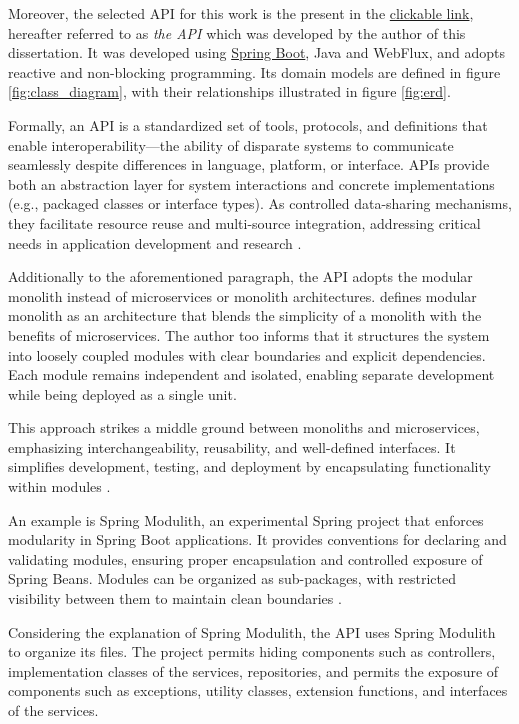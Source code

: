 Moreover, the selected API for this work is the present in the \href{https://github.com/LazaroDamasceno/Reactive-Medical-Appointments-Management-API.git}{clickable link}, hereafter referred to as \textit{the API} which was developed by the author of this dissertation. It was developed using  \hyperref[appendix:glossary]{Spring Boot}, Java and WebFlux, and adopts reactive and non-blocking programming. Its domain models are defined in figure \ref{fig:class_diagram}, with their relationships illustrated in figure \ref{fig:erd}.

Formally, an API is a standardized set of tools, protocols, and definitions that enable interoperability—the ability of disparate systems to communicate seamlessly despite differences in language, platform, or interface. APIs provide both an abstraction layer for system interactions and concrete implementations (e.g., packaged classes or interface types). As controlled data-sharing mechanisms, they facilitate resource reuse and multi-source integration, addressing critical needs in application development 
 and research 
 \cite{aksu2016visualization, dullabh2020application, hussain2020enterprise, matilainen2011multicore, mcguire2013publisher, 
 swaminathan2016review, wegner1996}.

Additionally to the aforementioned paragraph, the API adopts the modular monolith instead of microservices or monolith architectures. 
\cite{su2024modular} defines modular monolith as an architecture that blends the simplicity of a monolith with the benefits of microservices. The author too informs that it structures the system into loosely coupled modules with clear boundaries and explicit dependencies. Each module remains independent and isolated, enabling separate development while being deployed as a single unit.

This approach strikes a middle ground between monoliths and microservices, emphasizing interchangeability, reusability, and well-defined interfaces. It simplifies development, testing, and deployment by encapsulating functionality within modules \cite{su2024modular}.

An example is Spring Modulith, an experimental Spring project that enforces modularity in Spring Boot applications. It provides conventions for declaring and validating modules, ensuring proper encapsulation and controlled exposure of Spring Beans. Modules can be organized as sub-packages, with restricted visibility between them to maintain clean boundaries \cite{su2024modular}.

Considering the explanation of Spring Modulith, the API uses Spring Modulith to organize its files. The project permits hiding components such as controllers, implementation classes of the services, repositories, and permits the exposure of components such as exceptions, utility classes, extension functions, and interfaces of the services. 

